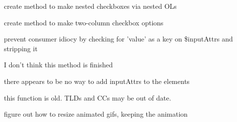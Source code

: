 \begin{DoxyRefList}
create method to make nested checkboxes via nested O\-Ls 

create method to make two-\/column checkbox options 

prevent consumer idiocy by checking for 'value' as a key on \$input\-Attrs and stripping it 
\item[\label{todo__todo000010}%
\hypertarget{todo__todo000010}{}%
Global \hyperlink{classg_form_boot_strap_a83c6bbcee34e89edaf5981a1eda2da2b}{g\-Form\-Boot\-Strap\-:\-:checkbox\-Nested} (\$varname, \$value\-\_\-array, \$method=null, \$display=\char`\"{}block\char`\"{}, \$input\-Attrs=null, \$wrapper\-Attrs=null, \$label\-Attrs=null)]I don't think this method is finished 
\item[\label{todo__todo000009}%
\hypertarget{todo__todo000009}{}%
Global \hyperlink{classg_form_boot_strap_a9d6a45eabcab3b8a17165663cec6e513}{g\-Form\-Boot\-Strap\-:\-:date\-Drop\-Set} (\$label, \$settings, \$varname, \$wrapper\-Attrs=null, \$label\-Attrs=null, \$post\-String= '')]there appears to be no way to add input\-Attrs to the elements 
\item[\label{todo__todo000011}%
\hypertarget{todo__todo000011}{}%
Global \hyperlink{classg_form_utils_a41fe8b8a7326496b9b98358fd231d89e}{g\-Form\-Utils\-:\-:Mail\-Val} (\$\-Addr, \$\-Level, \$\-Timeout=15000)]this function is old. T\-L\-Ds and C\-Cs may be out of date. 
\item[\label{todo__todo000012}%
\hypertarget{todo__todo000012}{}%
Class \hyperlink{class_images}{Images} ]figure out how to resize animated gifs, keeping the animation 
\end{DoxyRefList}